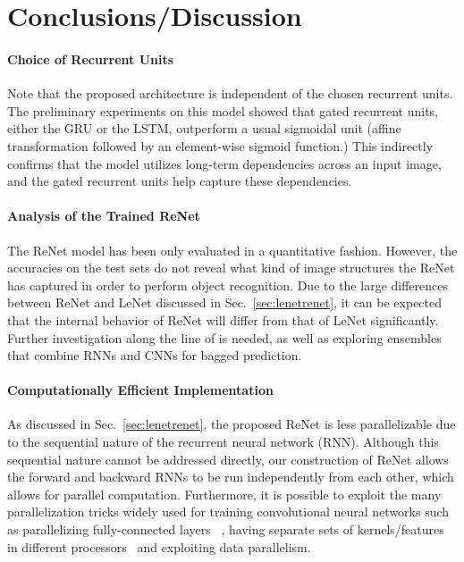\section{Conclusions/Discussion}

\paragraph{Choice of Recurrent Units}
Note that the proposed architecture is independent of the chosen recurrent
units. The preliminary experiments on this model showed that gated recurrent
units, either the GRU or the LSTM, outperform a usual sigmoidal unit (affine
transformation followed by an element-wise sigmoid function.) This indirectly
confirms that the model utilizes long-term dependencies across an input image,
and the gated recurrent units help capture these dependencies.

\paragraph{Analysis of the Trained ReNet}
The ReNet model has been only evaluated in a quantitative fashion. However, the
accuracies on the test sets do not reveal what kind of image structures the
ReNet has captured in order to perform object recognition. Due to the large
differences between ReNet and LeNet discussed in Sec.~\ref{sec:lenetrenet}, it
can be expected that the internal behavior of ReNet will differ from that of
LeNet significantly. Further investigation along the line of
\citep{ZeilerFergus14} is needed, as well as exploring ensembles that combine
RNNs and CNNs for bagged prediction.

\paragraph{Computationally Efficient Implementation}
As discussed in Sec.~\ref{sec:lenetrenet}, the proposed ReNet is less
parallelizable due to the sequential nature of the recurrent neural network
(RNN). Although this sequential nature cannot be addressed directly, our
construction of ReNet allows the forward and backward RNNs to be run
independently from each other, which allows for parallel computation.
Furthermore, it is possible to exploit the many parallelization tricks widely
used for training convolutional neural networks such as parallelizing
fully-connected layers ~\citep{krizhevsky2014one}, having separate sets of
kernels/features in different processors~\citep{Krizhevsky-2012} and exploiting
data parallelism.


